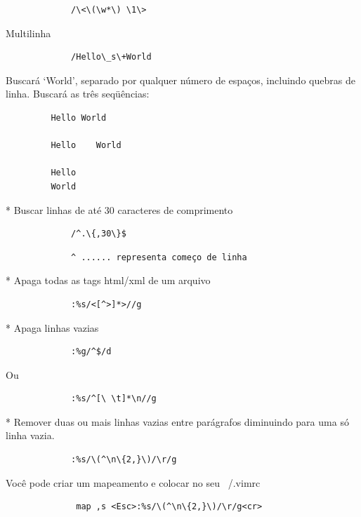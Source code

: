 \documentclass[10pt,a4paper,openany]{book}
\begin{document}
\begin{verbatim}
			 /\<\(\w*\) \1\>
\end{verbatim}

Multilinha

\begin{verbatim}
			 /Hello\_s\+World
\end{verbatim}

Buscará `World', separado por qualquer número de espaços,
incluindo quebras de linha. Buscará as três seqüências:

\begin{verbatim}
		 Hello World

		 Hello    World

		 Hello
		 World
\end{verbatim}

* Buscar linhas de até 30 caracteres de comprimento

\begin{verbatim}
			 /^.\{,30\}$
\end{verbatim}

\begin{verbatim}
			 ^ ...... representa começo de linha
\end{verbatim}

* Apaga todas as tags html/xml de um arquivo

\begin{verbatim}
			 :%s/<[^>]*>//g
\end{verbatim}

* Apaga linhas vazias

\begin{verbatim}
			 :%g/^$/d
\end{verbatim}

Ou

\begin{verbatim}
			 :%s/^[\ \t]*\n//g
\end{verbatim}

* Remover duas ou mais linhas vazias entre parágrafos diminuindo para
uma só linha vazia.

\begin{verbatim}
			 :%s/\(^\n\{2,}\)/\r/g
\end{verbatim}

Você pode criar um mapeamento e colocar no seu ~/.vimrc

\begin{verbatim}
			  map ,s <Esc>:%s/\(^\n\{2,}\)/\r/g<cr>
\end{verbatim}
\end{document}
